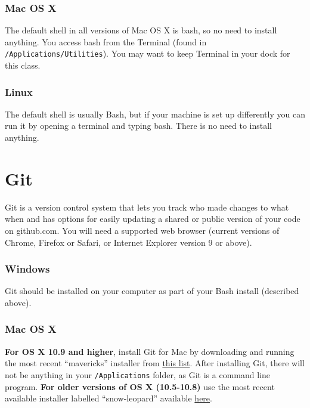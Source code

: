 \documentclass[]{book}
\begin{document}
\subsubsection*{Mac OS X}\label{mac-os-x}

The default shell in all versions of Mac OS X is bash, so no need to
install anything. You access bash from the Terminal (found in
\texttt{/Applications/Utilities}). You may want to keep Terminal in your
dock for this class.

\subsubsection*{Linux}\label{linux}

The default shell is usually Bash, but if your machine is set up
differently you can run it by opening a terminal and typing bash. There
is no need to install anything.

\section{Git}\label{git}

Git is a version control system that lets you track who made changes to
what when and has options for easily updating a shared or public version
of your code on github.com. You will need a supported web browser
(current versions of Chrome, Firefox or Safari, or Internet Explorer
version 9 or above).

\subsubsection*{Windows}\label{windows-1}

Git should be installed on your computer as part of your Bash install
(described above).

\subsubsection*{Mac OS X}\label{mac-os-x-1}

\textbf{For OS X 10.9 and higher}, install Git for Mac by downloading
and running the most recent ``mavericks'' installer from
\href{http://sourceforge.net/projects/git-osx-installer/files/}{this
list}. After installing Git, there will not be anything in your
\texttt{/Applications} folder, as Git is a command line program.
\textbf{For older versions of OS X (10.5-10.8)} use the most recent
available installer labelled ``snow-leopard'' available
\href{http://sourceforge.net/projects/git-osx-installer/files/}{here}.
\end{document}
